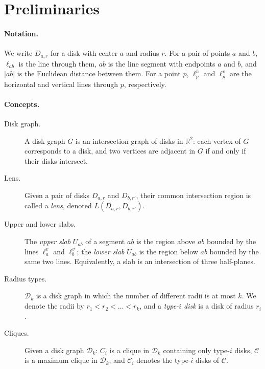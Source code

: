 \documentclass[12pt]{article}
\begin{document}
\section{Preliminaries}\label{sec:prelim}
\paragraph{Notation.}
We write $D_{a,r}$ for a disk with center $a$ and radius $r$. For a pair of
points $a$ and $b$, $\ell_{ab}$ is the line through them, $ab$ is the line
segment with endpoints $a$ and $b$, and $|ab|$ is the Euclidean distance
between them. For a point $p$, $\ell^h_p$ and $\ell^v_p$ are the horizontal
and vertical lines through $p$, respectively.

\paragraph{Concepts.}
\begin{description}
  \item[Disk graph.] A disk graph $G$ is an intersection graph of disks in
    $\mathbb{R}^2$: each vertex of $G$ corresponds to a disk, and two
    vertices are adjacent in $G$ if and only if their disks intersect.

  \item[Lens.] Given a pair of disks $D_{a,r}$ and $D_{b,r'}$, their common
    intersection region is called a \emph{lens}, denoted
    $L(D_{a,r}, D_{b,r'})$.

  \item[Upper and lower slabs.] The \emph{upper slab} $U_{ab}$ of a segment
    $ab$ is the region above $ab$ bounded by the lines $\ell^v_a$ and
    $\ell^v_b$; the \emph{lower slab} $\overline{U}_{ab}$ is the region below
    $ab$ bounded by the same two lines. Equivalently, a slab is an
    intersection of three half-planes.

  \item[Radius types.] $\mathcal{D}_k$ is a disk graph in which the number of
    different radii is at most $k$. We denote the radii by
    $r_1 < r_2 < \dots < r_k$, and a \emph{type-$i$ disk} is a disk of
    radius $r_i$.

  \item[Cliques.] Given a disk graph $\mathcal{D}_k$: $C_i$ is a clique in
    $\mathcal{D}_k$ containing only type-$i$ disks, $\mathcal{C}$ is a
    maximum clique in $\mathcal{D}_k$, and $\mathcal{C}_i$ denotes the
    type-$i$ disks of $\mathcal{C}$.
\end{description}
\end{document}
